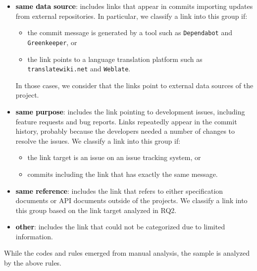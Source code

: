 \documentclass[smallextended]{svjour3}       %
\newcommand{\fix}[1]{\textcolor{black}{#1}}
\begin{document}
\begin{itemize}
\item \fix{\textbf{same data source}}: includes links that appear in commits importing updates from external repositories. 
In particular, we classify a link into this group if:
\begin{itemize}
    \item the commit message is generated by a tool such as \texttt{Dependabot} and \texttt{Greenkeeper}, or
    \item the link points to a language translation platform such as \texttt{translatewiki.net} and \texttt{Weblate}.
\end{itemize}
In those cases, we consider that the links point to external data sources of the project.
\item \fix{\textbf{same purpose}}: includes the link pointing to development issues, including feature requests and bug reports. 
Links repeatedly appear in the commit history, probably because the developers needed a number of changes to resolve the issues.
We classify a link into this group if:
\begin{itemize}
    \item the link target is an issue on an issue tracking system, or
    \item commits including the link that has exactly the same message.
\end{itemize}
\item \fix{\textbf{same reference}}: includes the link that refers to either specification documents or API documents outside of the projects.
We classify a link into this group based on the link target analyzed in RQ2.
\item \fix{\textbf{other}}: includes the link that could not be categorized due to limited information.
\end{itemize}
While the codes and rules emerged from manual analysis, the sample is analyzed by the above rules.
\end{document}
